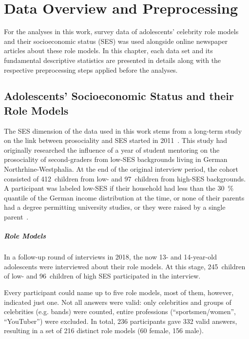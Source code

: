\renewcommand{\imagepath}{../30-mot/img}

\chapter{Data Overview and Preprocessing}
For the analyses in this work, survey data of adolescents' celebrity role models and their socioeconomic status (SES) was used alongside online newspaper articles about these role models. In this chapter, each data set and its fundamental descriptive statistics are presented in details along with the respective preprocessing steps applied before the analyses.

\section{Adolescents' Socioeconomic Status and their Role Models}
The SES dimension of the data used in this work stems from a long-term study on the link between prosociality and SES started in 2011~\autocite{kosse_formation_2020}. This study had originally researched the influence of a year of student mentoring on the prosociality of second-graders from low-SES backgrounds living in German Northrhine-Westphalia. At the end of the original interview period, the cohort consisted of \SI{412}{children} from low- and \SI{97}{children} from high-SES backgrounds. A participant was labeled low-SES if their household had less than the \SI{30}{\percent} quantile of the German income distribution at the time, or none of their parents had a degree permitting university studies, or they were raised by a single parent~\autocite{kosse_formation_2020}.

\paragraph{Role Models}
In a follow-up round of interviews in 2018, the now 13- and 14-year-old adolescents were interviewed about their role models. At this stage, \SI{245}{children} of low- and \SI{96}{children} of high SES participated in the interview.

Every participant could name up to five role models, most of them, however, indicated just one. Not all answers were valid: only celebrities and groups of celebrities (e.g. bands) were counted, entire professions (``sportsmen/women'', ``YouTuber'') were excluded. In total, \SI{236}{} participants gave \SI{332}{} valid answers, resulting in a set of \SI{216}{} distinct role models (\SI{60}{} female, \SI{156}{} male).

